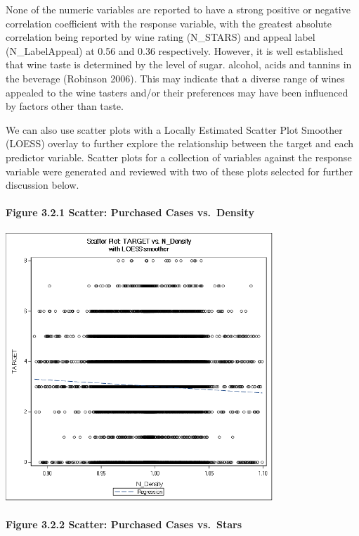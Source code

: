 \documentclass[]{article}
\let\oldparagraph\paragraph
\renewcommand{\paragraph}[1]{\oldparagraph{#1}\mbox{}}
\begin{document}
None of the numeric variables are reported to have a strong positive or
negative correlation coefficient with the response variable, with the
greatest absolute correlation being reported by wine rating (N\_STARS)
and appeal label (N\_LabelAppeal) at 0.56 and 0.36 respectively.
However, it is well established that wine taste is determined by the
level of sugar. alcohol, acids and tannins in the beverage (Robinson
2006). This may indicate that a diverse range of wines appealed to the
wine tasters and/or their preferences may have been influenced by
factors other than taste.

We can also use scatter plots with a Locally Estimated Scatter Plot
Smoother (LOESS) overlay to further explore the relationship between the
target and each predictor variable. Scatter plots for a collection of
variables against the response variable were generated and reviewed with
two of these plots selected for further discussion below.

\newpage

\paragraph{Figure 3.2.1 Scatter: Purchased Cases
vs.~Density}\label{figure-3.2.1-scatter-purchased-cases-vs.density}

\includegraphics[height=3.95833in]{images/scatter_density.png}

\paragraph{Figure 3.2.2 Scatter: Purchased Cases
vs.~Stars}\label{figure-3.2.2-scatter-purchased-cases-vs.stars}
\end{document}
